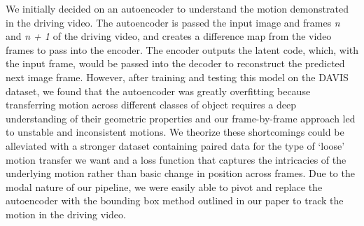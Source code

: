 We initially decided on an autoencoder to understand the motion demonstrated in the driving video. The autoencoder is passed the input image and frames \textit{n} and \textit{n + 1} of the driving video, and creates a difference map from the video frames to pass into the encoder. The encoder outputs the latent code, which, with the input frame, would be passed into the decoder to reconstruct the predicted next image frame. However, after training and testing this model on the DAVIS dataset, we found that the autoencoder was greatly overfitting because transferring motion across different classes of object requires a deep understanding of their geometric properties and our frame-by-frame approach led to unstable and inconsistent motions. We theorize these shortcomings could be alleviated with a stronger dataset containing paired data for the type of ‘loose’ motion transfer we want and a loss function that captures the intricacies of the underlying motion rather than basic change in position across frames. Due to the modal nature of our pipeline, we were easily able to pivot and replace the autoencoder with the bounding box method outlined in our paper to track the motion in the driving video.
